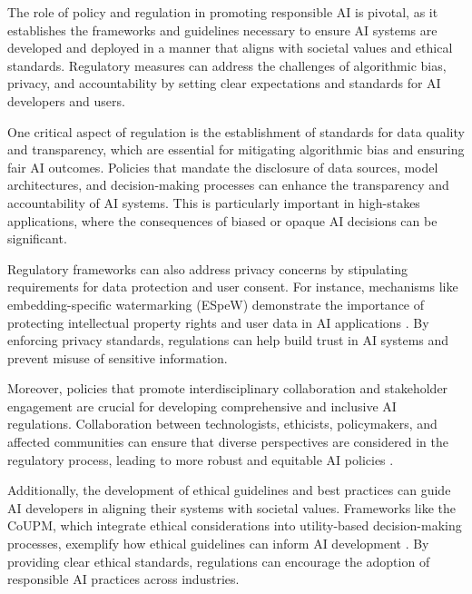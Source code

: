 The role of policy and regulation in promoting responsible AI is pivotal, as it establishes the frameworks and guidelines necessary to ensure AI systems are developed and deployed in a manner that aligns with societal values and ethical standards. Regulatory measures can address the challenges of algorithmic bias, privacy, and accountability by setting clear expectations and standards for AI developers and users.



One critical aspect of regulation is the establishment of standards for data quality and transparency, which are essential for mitigating algorithmic bias and ensuring fair AI outcomes. Policies that mandate the disclosure of data sources, model architectures, and decision-making processes can enhance the transparency and accountability of AI systems. This is particularly important in high-stakes applications, where the consequences of biased or opaque AI decisions can be significant.



Regulatory frameworks can also address privacy concerns by stipulating requirements for data protection and user consent. For instance, mechanisms like embedding-specific watermarking (ESpeW) demonstrate the importance of protecting intellectual property rights and user data in AI applications \cite{wang2024espewrobustcopyrightprotection}. By enforcing privacy standards, regulations can help build trust in AI systems and prevent misuse of sensitive information.



Moreover, policies that promote interdisciplinary collaboration and stakeholder engagement are crucial for developing comprehensive and inclusive AI regulations. Collaboration between technologists, ethicists, policymakers, and affected communities can ensure that diverse perspectives are considered in the regulatory process, leading to more robust and equitable AI policies \cite{korre2023takesvillagemultidisciplinaritycollaboration}.



Additionally, the development of ethical guidelines and best practices can guide AI developers in aligning their systems with societal values. Frameworks like the CoUPM, which integrate ethical considerations into utility-based decision-making processes, exemplify how ethical guidelines can inform AI development \cite{gan2019correlatedutilitybasedpatternmining}. By providing clear ethical standards, regulations can encourage the adoption of responsible AI practices across industries.



